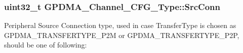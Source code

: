 \hypertarget{struct_g_p_d_m_a___channel___c_f_g___type_a1b813afe8cc41880be405d7f598cedf0}{
\subsubsection[{\-Src\-Conn}]{\setlength{\rightskip}{0pt plus 5cm}uint32\-\_\-t {\bf \-G\-P\-D\-M\-A\-\_\-\-Channel\-\_\-\-C\-F\-G\-\_\-\-Type\-::\-Src\-Conn}}}\label{struct_g_p_d_m_a___channel___c_f_g___type_a1b813afe8cc41880be405d7f598cedf0}
\-Peripheral \-Source \-Connection type, used in case \-Transfer\-Type is chosen as \-G\-P\-D\-M\-A\-\_\-\-T\-R\-A\-N\-S\-F\-E\-R\-T\-Y\-P\-E\-\_\-\-P2\-M or \-G\-P\-D\-M\-A\-\_\-\-T\-R\-A\-N\-S\-F\-E\-R\-T\-Y\-P\-E\-\_\-\-P2\-P, should be one of following\-:
